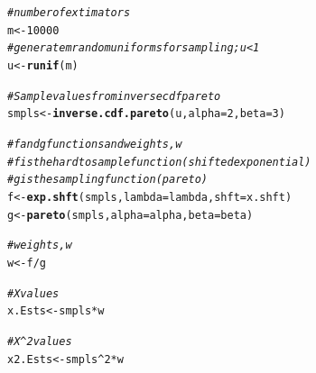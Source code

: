 \documentclass{article}\usepackage[]{graphicx}\usepackage[]{color}
\makeatletter
\newcommand{\hlnum}[1]{\textcolor[rgb]{0.686,0.059,0.569}{#1}}%
\newcommand{\hlcom}[1]{\textcolor[rgb]{0.678,0.584,0.686}{\textit{#1}}}%
\newcommand{\hlopt}[1]{\textcolor[rgb]{0,0,0}{#1}}%
\newcommand{\hlstd}[1]{\textcolor[rgb]{0.345,0.345,0.345}{#1}}%
\newcommand{\hlkwb}[1]{\textcolor[rgb]{0.69,0.353,0.396}{#1}}%
\newcommand{\hlkwc}[1]{\textcolor[rgb]{0.333,0.667,0.333}{#1}}%
\newcommand{\hlkwd}[1]{\textcolor[rgb]{0.737,0.353,0.396}{\textbf{#1}}}%
\newenvironment{kframe}{%
 \def\at@end@of@kframe{}%
 \ifinner\ifhmode%
  \def\at@end@of@kframe{\end{minipage}}%
  \begin{minipage}{\columnwidth}%
 \fi\fi%
 \def\FrameCommand##1{\hskip\@totalleftmargin \hskip-\fboxsep
 \colorbox{shadecolor}{##1}\hskip-\fboxsep
     \hskip-\linewidth \hskip-\@totalleftmargin \hskip\columnwidth}%
 \MakeFramed {\advance\hsize-\width
   \@totalleftmargin\z@ \linewidth\hsize
   \@setminipage}}%
 {\par\unskip\endMakeFramed%
 \at@end@of@kframe}
\newenvironment{knitrout}{}{} %
\makeatother
\begin{document}
\begin{knitrout}
\begin{kframe}
\begin{alltt}
\hlcom{#number of extimators}
\hlstd{m} \hlkwb{<-} \hlnum{10000}
\hlcom{#generate m random uniforms for sampling; u < 1}
\hlstd{u} \hlkwb{<-} \hlkwd{runif}\hlstd{(m)}

\hlcom{#Sample values from inverse cdf pareto}
\hlstd{smpls} \hlkwb{<-} \hlkwd{inverse.cdf.pareto}\hlstd{(u,} \hlkwc{alpha} \hlstd{=} \hlnum{2}\hlstd{,} \hlkwc{beta} \hlstd{=} \hlnum{3}\hlstd{)}

\hlcom{#f and g functions and weights, w}
\hlcom{#f is the hard to sample function (shifted exponential)}
\hlcom{#g is the sampling function (pareto)}
\hlstd{f} \hlkwb{<-} \hlkwd{exp.shft}\hlstd{(smpls,} \hlkwc{lambda} \hlstd{= lambda,} \hlkwc{shft} \hlstd{= x.shft)}
\hlstd{g} \hlkwb{<-} \hlkwd{pareto}\hlstd{(smpls,} \hlkwc{alpha} \hlstd{= alpha,} \hlkwc{beta} \hlstd{= beta)}

\hlcom{#weights, w}
\hlstd{w} \hlkwb{<-} \hlstd{f} \hlopt{/} \hlstd{g}

\hlcom{#X values}
\hlstd{x.Ests}  \hlkwb{<-} \hlstd{smpls}\hlopt{*}\hlstd{w}

\hlcom{#X^2 values}
\hlstd{x2.Ests} \hlkwb{<-} \hlstd{smpls}\hlopt{^}\hlnum{2}\hlopt{*}\hlstd{w}


\end{alltt}
\end{kframe}
\end{knitrout}
\end{document}
